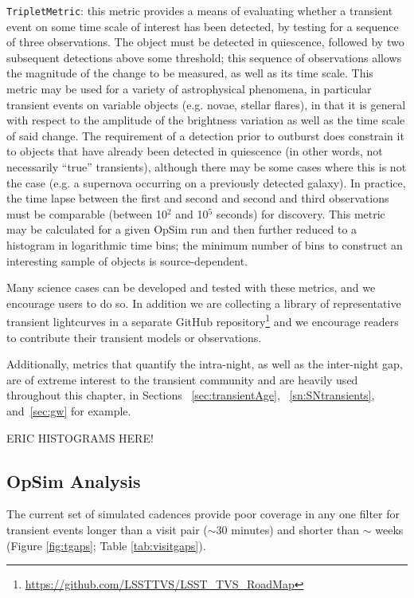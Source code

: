 \texttt{TripletMetric}: this metric provides a means of evaluating whether a transient event
on some time scale of interest has been detected, by testing for a
sequence of three observations. The object must be detected in
quiescence, followed by two subsequent detections above some
threshold; this sequence of observations allows the magnitude of the
change to be measured, as well as its time scale.
This metric may be used for a variety of astrophysical phenomena, in
particular transient events on variable objects (e.g. novae, stellar
flares), in that it is general with respect to the amplitude of the
brightness variation as well as the time scale of said change. The
requirement of a detection prior to outburst does constrain it to
objects that have already been detected in quiescence (in other words,
not necessarily ``true'' transients), although there may be some cases
where this is not the case (e.g. a supernova occurring on a previously
detected galaxy). In practice, the time lapse between the first and
second and second and third observations must be comparable (between
10$^2$ and 10$^5$ seconds) for discovery. This metric may be
calculated for a given OpSim run and then further reduced to a
histogram in logarithmic time bins; the minimum number of bins to
construct an interesting sample of objects is source-dependent.

Many science cases can be developed and tested with these metrics, and we encourage users to do so. In addition we are collecting a library of representative transient lightcurves in a separate GitHub repository\footnote{\url{https://github.com/LSSTTVS/LSST_TVS_RoadMap}} and we encourage readers to contribute their transient models or observations.

Additionally, metrics that quantify the intra-night, as well as the inter-night gap, are of extreme interest to the transient community and are heavily used throughout this chapter, in Sections ~\ref{sec:transientAge}, ~\ref{sn:SNtransients}, and~\ref{sec:gw} for example.

ERIC HISTOGRAMS HERE!



\subsection{OpSim Analysis}
\label{sec:\chpname:analysis}

The current set of simulated cadences 
provide poor coverage in any one
filter for transient events longer than a visit pair ($\sim$30
minutes) and shorter than $\sim$ weeks (Figure \ref{fig:tgaps}; Table
\ref{tab:visitgaps}).  

